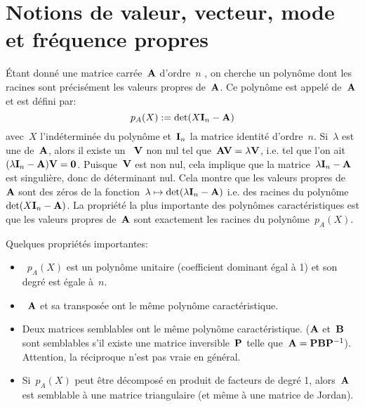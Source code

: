 
\medskip
\section{Notions de valeur, vecteur, mode et fréquence propres}

\medskip
Étant donné une matrice carrée~$\MM{A}$ d'ordre~$n$ , on cherche un polynôme dont les racines sont précisément les valeurs propres de~$\MM{A}$. Ce polynôme est appelé  de~$\MM{A}$ et est défini par:
\begin{equation} p_A(X):=\det(X\MM{I}_n-\MM{A})\end{equation}
avec~$X$ l'indéterminée du polynôme et~$\MM{I}_n$ la matrice identité d'ordre~$n$.
\medskipvm
Si~$\lambda$ est une  de~$\MM{A}$, alors il existe un ~$\VV{V}$ non nul tel que~$\MM{A}\VV{V} = \lambda \VV{V}$, i.e. tel que l'on ait~$(\lambda \MM{I}_n-\MM{A})\VV{V} = \VV{0}$.
\medskipvm
Puisque~$\VV{V}$ est non nul, cela implique que la matrice~$\lambda \MM{I}_n-\MM{A}$ est singulière, donc de déterminant nul.
\medskipvm
Cela montre que les valeurs propres de~$\MM{A}$ sont des zéros de la fonction~$\lambda\mapsto \det(\lambda \MM{I}_n - \MM{A})$
i.e. des racines du polynôme~$\det(X\MM{I}_n-\MM{A})$.
\medskipvm
La propriété la plus importante des polynômes caractéristiques est que les valeurs propres de~$\MM{A}$ sont exactement les racines du polynôme~$p_A(X)$.

\medskip
Quelques propriétés importantes:
\begin{itemize}
  \item~$p_A(X)$ est un polynôme unitaire (coefficient dominant égal à 1) et son degré
	est égale à~$n$.
  \item~$\MM{A}$ et sa transposée ont le même polynôme caractéristique.
  \item Deux matrices semblables ont le même polynôme caractéristique. ($\MM{A}$ et~$\MM{B}$ sont semblables s'il
	existe une matrice inversible~$\MM{P}$ telle que~$\MM{A} = \MM{P}\MM{B}\MMI{P}$).
	Attention, la réciproque n'est pas vraie en général.
  \item Si~$p_A(X)$ peut être décomposé en produit de facteurs de degré 1, alors~$\MM{A}$ est semblable
	à une matrice triangulaire (et même à une matrice de Jordan).
\end{itemize}

